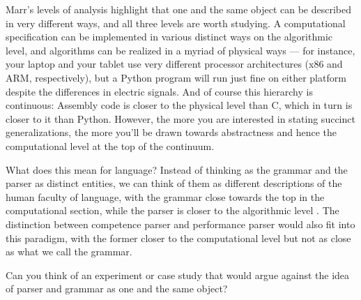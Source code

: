 %
Marr's levels of analysis highlight that one and the same object can be described in very different ways, and all three levels are worth studying.
A computational specification can be implemented in various distinct ways on the algorithmic level, and algorithms can be realized in a myriad of physical ways --- for instance, your laptop and your tablet use very different processor architectures (x86 and ARM, respectively), but a Python program will run just fine on either platform despite the differences in electric signals.
And of course this hierarchy is continuous: Assembly code is closer to the physical level than C, which in turn is closer to it than Python.
However, the more you are interested in stating succinct generalizations, the more you'll be drawn towards abstractness and hence the computational level at the top of the continuum.

What does this mean for language?
Instead of thinking as the grammar and the parser as distinct entities, we can think of them as different descriptions of the human faculty of language, with the grammar close towards the top in the computational section, while the parser is closer to the algorithmic level \citep[cf.][]{NeelemanKoot10}.
The distinction between competence parser and performance parser would also fit into this paradigm, with the former closer to the computational level but not as close as what we call the grammar.

\begin{exercise}
    Can you think of an experiment or case study that would argue against the idea of parser and grammar as one and the same object?
\end{exercise}





